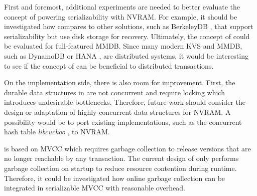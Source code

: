 First and foremost, additional experiments are needed to better evaluate the
concept of powering serializability with NVRAM. For example, it should be
investigated how \midas compares to other solutions, such as BerkeleyDB
\cite{olson1999berkeley}, that support serializability but use disk storage for
recovery. Ultimately, the concept of \midas could be evaluated for full-featured
MMDB. Since many modern KVS and MMDB, such as DynamoDB \cite{decandia2007dynamo}
or HANA \cite{lee2013sap}, are distributed systems, it would be interesting to
see if the concept of \midas can be beneficial to distributed transactions.

On the implementation side, there is also room for improvement. First, the
durable data structures in \midas are not concurrent and require locking which
introduces undesirable bottlenecks. Therefore, future work should consider the
design or adaptation of highly-concurrent data structures for NVRAM. A
possibility would be to port existing implementations, such as the concurrent
hash table \emph{libcuckoo} \cite{li2014algorithmic}, to NVRAM.

\midas is based on MVCC which requires garbage collection to release versions
that are no longer reachable by any transaction. The current design of \midas
only performs garbage collection on startup to reduce resource contention during
runtime. Therefore, it could be investigated how online garbage collection
can be integrated in serializable MVCC with reasonable overhead.
